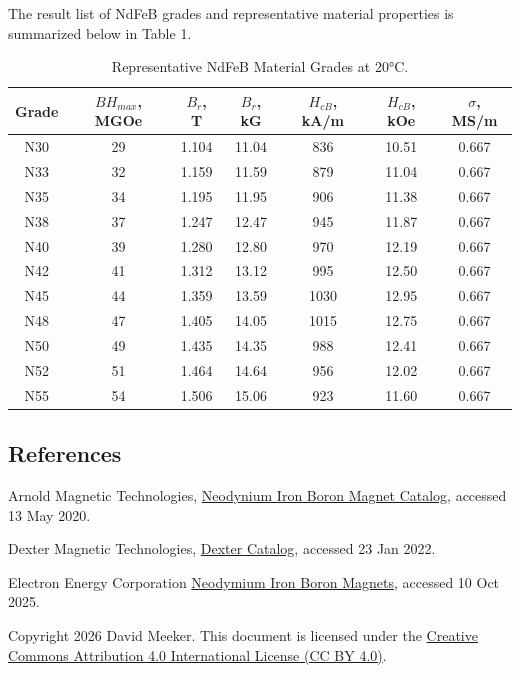 \documentclass{article}
\begin{document}
The result list of NdFeB grades and representative material properties is summarized below in Table 1.

\begin{table}
\centering
\begin{tabular} {|c|c|c|c|c|c|c|}
\hline
Grade & \(BH_{max}\), MGOe & \(B_r\), T & \(B_r\), kG & \(H_{cB}\), kA/m & \(H_{cB}\), kOe & \(\sigma\), MS/m \\ \hline \hline
N30 & 29 & 1.104 & 11.04 & 836 & 10.51 & 0.667 \\ \hline
N33 & 32 & 1.159 & 11.59 & 879 & 11.04 & 0.667 \\ \hline
N35 & 34 & 1.195 & 11.95 & 906 & 11.38 & 0.667 \\ \hline
N38 & 37 & 1.247 & 12.47 & 945 & 11.87 & 0.667 \\ \hline
N40 & 39 & 1.280 & 12.80 & 970 & 12.19 & 0.667 \\ \hline
N42 & 41 & 1.312 & 13.12 & 995 & 12.50 & 0.667 \\ \hline
N45 & 44 & 1.359 & 13.59 & 1030 & 12.95 & 0.667 \\ \hline
N48 & 47 & 1.405 & 14.05 & 1015 & 12.75 & 0.667 \\ \hline
N50 & 49 & 1.435 & 14.35 & 988 & 12.41 & 0.667 \\ \hline
N52 & 51 & 1.464 & 14.64 & 956 & 12.02 & 0.667 \\ \hline
N55 & 54 & 1.506 & 15.06 & 923 & 11.60 & 0.667 \\ \hline
\end{tabular}
\caption{Representative NdFeB Material Grades at 20°C.}
\end{table}

\subsection*{References}

\noindent Arnold Magnetic Technologies, \href{https://web.archive.org/web/20200513225014/https://www.arnoldmagnetics.com/wp-content/uploads/2019/06/Arnold-Neo-Catalog.pdf}{Neodynium Iron Boron Magnet Catalog}, accessed 13 May 2020.

\noindent Dexter Magnetic Technologies, \href{https://web.archive.org/web/20220123232850/https://www.dextermag.com/wp-content/uploads/2016/10/Dexter_Nd-Fe-B__Curves_Properties_Table.pdf}{Dexter Catalog}, accessed 23 Jan 2022.

\noindent Electron Energy Corporation \href{https://web.archive.org/web/20251010021738/https://www.electronenergy.com/hubfs/EEC_NdFeB_Information.pdf}{Neodymium Iron Boron Magnets}, accessed 10 Oct 2025.

\noindent Copyright 2026 David Meeker. This document is licensed under the \href{https://creativecommons.org/licenses/by/4.0/}{Creative Commons Attribution 4.0 International License (CC BY 4.0)}.
\end{document}
